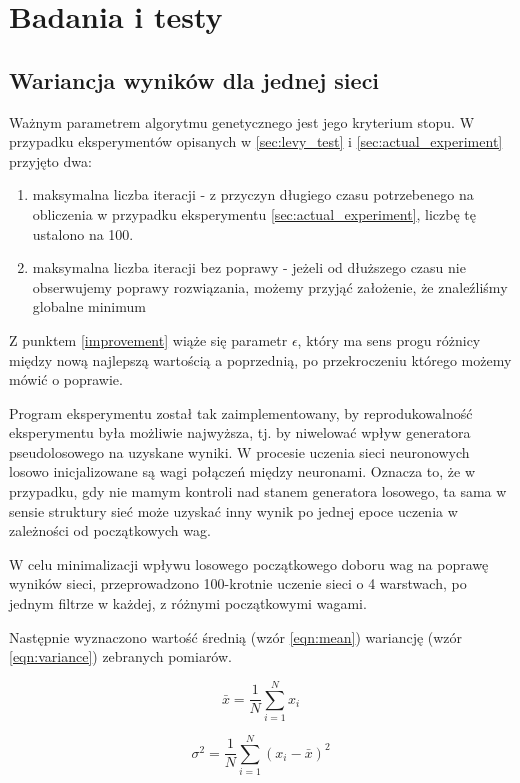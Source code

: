 \chapter{Badania i testy}
\section{Wariancja wyników dla jednej sieci}\label{sec:std_dev}
Ważnym parametrem algorytmu genetycznego jest jego kryterium stopu.
W przypadku eksperymentów opisanych w \ref{sec:levy_test} i \ref{sec:actual_experiment} przyjęto dwa:
\begin{enumerate}
  \item maksymalna liczba iteracji - z przyczyn długiego czasu potrzebenego na obliczenia w przypadku eksperymentu \ref{sec:actual_experiment}, liczbę tę ustalono na 100.
  \item maksymalna liczba iteracji bez poprawy - jeżeli od dłuższego czasu nie obserwujemy poprawy rozwiązania, możemy przyjąć założenie, że znaleźliśmy globalne minimum\label{improvement}
\end{enumerate}
Z punktem \ref{improvement} wiąże się parametr $\epsilon$, który ma sens progu różnicy między nową najlepszą wartością a poprzednią, po przekroczeniu którego możemy mówić o poprawie.

Program eksperymentu został tak zaimplementowany, by reprodukowalność eksperymentu była możliwie najwyższa, tj. by niwelować wpływ generatora pseudolosowego na uzyskane wyniki.
W procesie uczenia sieci neuronowych losowo inicjalizowane są wagi połączeń między neuronami.
Oznacza to, że w przypadku, gdy nie mamym kontroli nad stanem generatora losowego, ta sama w sensie struktury sieć może uzyskać inny wynik po jednej epoce uczenia w zależności od początkowych wag.

W celu minimalizacji wpływu losowego początkowego doboru wag na poprawę wyników sieci, przeprowadzono 100-krotnie uczenie sieci o 4 warstwach, po jednym filtrze w każdej, z różnymi początkowymi wagami.

Następnie wyznaczono wartość średnią (wzór \ref{eqn:mean}) wariancję (wzór \ref{eqn:variance}) zebranych pomiarów.

\begin{equation}\label{eqn:mean}
  \bar{x} = \frac{1}{N} \sum_{i=1}^{N} x_i
\end{equation}

\begin{equation}\label{eqn:variance}
  \sigma^2 = \frac{1}{N} \sum_{i=1}^{N}(x_i - \bar{x})^2
\end{equation}

